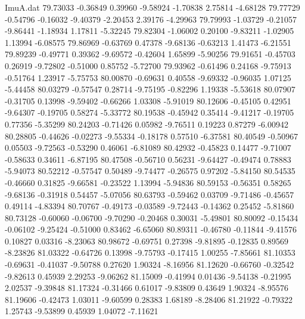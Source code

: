 \begin{filecontents}{ImuA.dat}
  79.73033   -0.36849    0.39960   -9.58924   -1.70838    2.75814   -4.68128
  79.77729   -0.54796   -0.16032   -9.40379   -2.20453    2.39176   -4.29963
  79.79993   -1.03729   -0.21057   -9.86441   -1.18934    1.17811   -5.32245
  79.82304   -1.06002    0.20100   -9.83211   -1.02905    1.13994   -6.08575
  79.86969   -0.63769    0.47378   -9.68136   -0.63213    1.41473   -6.21551
  79.89239   -0.49771    0.39362   -9.69572   -0.42604    1.65899   -5.90256
  79.91651   -0.45703    0.26919   -9.72802   -0.51000    0.85752   -5.72700
  79.93962   -0.61496    0.24168   -9.75913   -0.51764    1.23917   -5.75753
  80.00870   -0.69631    0.40558   -9.69332   -0.96035    1.07125   -5.44458
  80.03279   -0.57547    0.28714   -9.75195   -0.82296    1.19338   -5.53618
  80.07907   -0.31705    0.13998   -9.59402   -0.66266    1.03308   -5.91019
  80.12606   -0.45105    0.42951   -9.64307   -0.19705    0.58274   -5.33772
  80.19538   -0.45942    0.35414   -9.41217   -0.19705    0.77356   -5.35299
  80.24203   -0.71426    0.05982   -9.76511    0.19223    0.87279   -6.00942
  80.28805   -0.44626   -0.02273   -9.55334   -0.18178    0.57510   -6.37581
  80.40549   -0.50967    0.05503   -9.72563   -0.53290    0.46061   -6.81089
  80.42932   -0.45823    0.14477   -9.71007   -0.58633    0.34611   -6.87195
  80.47508   -0.56710    0.56231   -9.64427   -0.49474    0.78883   -5.94073
  80.52212   -0.57547    0.50489   -9.74477   -0.26575    0.97202   -5.84150
  80.54535   -0.46660    0.31825   -9.66581   -0.23522    1.13994   -5.94836
  80.59153   -0.56351    0.58265   -9.68136   -0.31918    0.54457   -5.07056
  80.63793   -0.59462    0.03709   -9.71486   -0.45657    0.49114   -4.83394
  80.70767   -0.49173   -0.03589   -9.72443   -0.14362    0.25452   -5.81860
  80.73128   -0.60060   -0.06700   -9.70290   -0.20468    0.30031   -5.49801
  80.80092   -0.15434   -0.06102   -9.25424   -0.51000    0.83462   -6.65060
  80.89311   -0.46780   -0.11844   -9.41576    0.10827    0.03316   -8.23063
  80.98672   -0.69751    0.27398   -9.81895   -0.12835    0.89569   -8.23826
  81.03322   -0.64726    0.13998   -9.75793   -0.17415    1.00255   -7.85661
  81.10353   -0.69631   -0.41037   -9.50788    0.27620    1.90324   -8.16956
  81.12620   -0.66760   -0.32542   -9.82613    0.45939    2.29253   -9.06262
  81.15009   -0.41994    0.01436   -9.54138   -0.21995    2.02537   -9.39848
  81.17324   -0.31466    0.61017   -9.83809    0.43649    1.90324   -8.95576
  81.19606   -0.42473    1.03011   -9.60599    0.28383    1.68189   -8.28406
  81.21922   -0.79322    1.25743   -9.53899    0.45939    1.04072   -7.11621

\end{filecontents}
